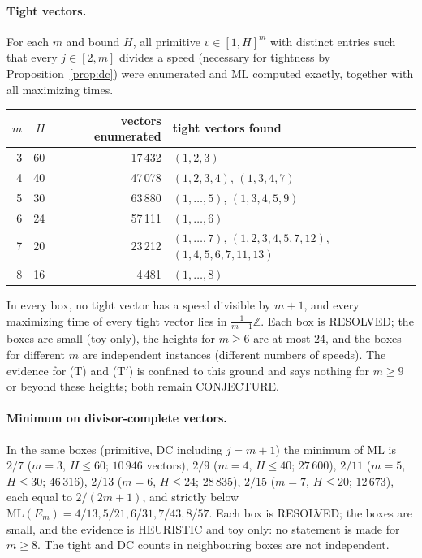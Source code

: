 \documentclass[11pt]{article}
\theoremstyle{remark}
\newcommand{\ML}{\mathrm{ML}}
\newcommand{\Z}{\mathbb{Z}}
\begin{document}
\paragraph{Tight vectors.} For each $m$ and bound $H$, all primitive $v\in[1,H]^m$ with distinct entries such that every $j\in[2,m]$ divides a speed (necessary for tightness by Proposition~\ref{prop:dc}) were enumerated and $\ML$ computed exactly, together with all maximizing times.
\begin{center}\footnotesize
\begin{tabular}{@{}rrrp{6.2cm}@{}}
\toprule
$m$ & $H$ & vectors enumerated & tight vectors found\\
\midrule
3 & 60 & 17\,432 & $(1,2,3)$\\
4 & 40 & 47\,078 & $(1,2,3,4)$, $(1,3,4,7)$\\
5 & 30 & 63\,880 & $(1,\dots,5)$, $(1,3,4,5,9)$\\
6 & 24 & 57\,111 & $(1,\dots,6)$\\
7 & 20 & 23\,212 & $(1,\dots,7)$, $(1,2,3,4,5,7,12)$, $(1,4,5,6,7,11,13)$\\
8 & 16 & 4\,481 & $(1,\dots,8)$\\
\bottomrule
\end{tabular}
\end{center}
In every box, no tight vector has a speed divisible by $m+1$, and every maximizing time of every tight vector lies in $\frac1{m+1}\Z$. Each box is RESOLVED; the boxes are small (toy only), the heights for $m\ge6$ are at most $24$, and the boxes for different $m$ are independent instances (different numbers of speeds). The evidence for (T) and (T$'$) is confined to this ground and says nothing for $m\ge9$ or beyond these heights; both remain CONJECTURE.

\paragraph{Minimum on divisor-complete vectors.} In the same boxes (primitive, DC including $j=m+1$) the minimum of $\ML$ is $2/7$ ($m=3$, $H\le60$; $10\,946$ vectors), $2/9$ ($m=4$, $H\le40$; $27\,600$), $2/11$ ($m=5$, $H\le30$; $46\,316$), $2/13$ ($m=6$, $H\le24$; $28\,835$), $2/15$ ($m=7$, $H\le20$; $12\,673$), each equal to $2/(2m+1)$, and strictly below $\ML(E_m)=4/13,5/21,6/31,7/43,8/57$. Each box is RESOLVED; the boxes are small, and the evidence is HEURISTIC and toy only: no statement is made for $m\ge8$. The tight and DC counts in neighbouring boxes are not independent.
\end{document}
